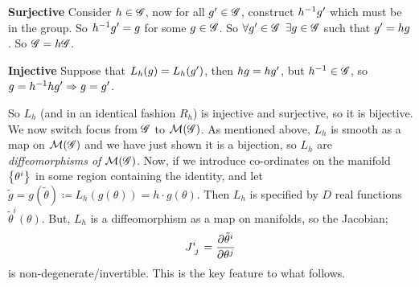 \paraskip
\textbf{Surjective} Consider $h \in \mathscr{G}$, now for all $g^{\prime} \in \mathscr{G}$, construct $h^{-1}g^{\prime}$ which must be in the group. So $h^{-1}g^{\prime} = g$ for some $g \in \mathscr{G}$. So $\forall g^{\prime} \in \mathscr{G}$ $\exists g \in \mathscr{G}$ such that $g^{\prime} = hg$. So $\mathscr{G} = h\mathscr{G}$. 

\paraskip
\textbf{Injective} Suppose that $L_h(g) = L_h(g^{\prime})$, then $hg = hg^{\prime}$, but $h^{-1} \in \mathscr{G}$, so $g = h^{-1}hg^{\prime} \Rightarrow g = g^{\prime}$. 

\paraskip
So $L_h$ (and in an identical fashion $R_h$) is injective and surjective, so it is bijective. We now switch focus from $\mathscr{G}$ to $\mathcal{M}(\mathscr{G})$. As mentioned above, $L_h$ is smooth as a map on $\mathcal{M}(\mathscr{G})$ and we have just shown it is a bijection, so $L_h$ are \emph{diffeomorphisms of} $\mathcal{M}(\mathscr{G})$. Now, if we introduce co-ordinates on the manifold $\set{\theta^i}$ in some region containing the identity, and let $\tilde{g} = g(\tilde{\theta}) \coloneqq L_h\left(g(\theta)\right) = h\cdot g(\theta)$. Then $L_h$ is specified by $D$ real functions $\tilde{\theta}^i(\theta)$. But, $L_h$ is a diffeomorphism as a map on manifolds, so the Jacobian;
\begin{equation*}
J\indices{^{i}_{j}} = \frac{\del \tilde{\theta}^i}{\del \theta^j}
\end{equation*}  
is non-degenerate/invertible. This is the key feature to what follows.
